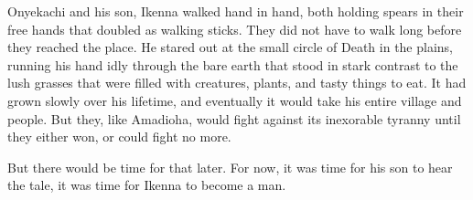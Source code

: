 Onyekachi and his son, Ikenna walked hand in hand, both holding spears in their free hands that doubled as walking sticks. They did not have to walk long before they reached the place. He stared out at the small circle of Death in the plains, running his hand idly through the bare earth that stood in stark contrast to the lush grasses that were filled with creatures, plants, and tasty things to eat. It had grown slowly over his lifetime, and eventually it would take his entire village and people. But they, like Amadioha, would fight against its inexorable tyranny until they either won, or could fight no more.

But there would be time for that later. For now, it was time for his son to hear the tale, it was time for Ikenna to become a man.